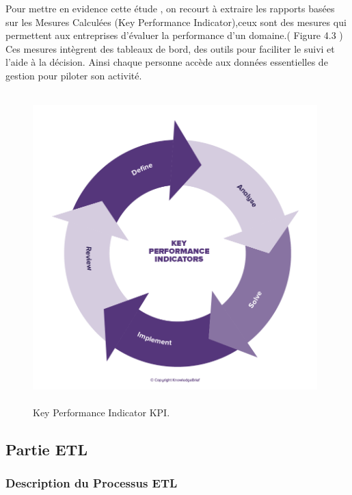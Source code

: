 Pour mettre en evidence cette \'{e}tude  , on recourt \`{a} extraire les rapports bas\'{e}es sur
les Mesures Calcul\'{e}es (Key Performance Indicator),ceux sont des mesures qui permettent aux entreprises d'\'{e}valuer la performance d'un
domaine.( Figure 4.3 ) \newline
Ces mesures int\`{e}grent des tableaux de bord, des outils pour faciliter le suivi et l'aide
\`{a} la d\'{e}cision. Ainsi chaque personne acc\`{e}de aux donn\'{e}es essentielles de gestion pour
piloter son activit\'{e}.



\begin{figure}[H]
\center
\includegraphics[width=11cm,height=12cm]{./figures/kpi.png}
\caption{Key Performance Indicator KPI.}
\end{figure}


\subsection{ Partie ETL }

\subsubsection{Description du Processus ETL }

